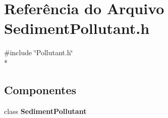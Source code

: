 \section{Referência do Arquivo Sediment\+Pollutant.\+h}
\label{_sediment_pollutant_8h}
{\ttfamily \#include \char`\"{}Pollutant.\+h\char`\"{}}\\*
\subsection*{Componentes}
\begin{DoxyCompactItemize}
\item 
class {\bf Sediment\+Pollutant}
\end{DoxyCompactItemize}
